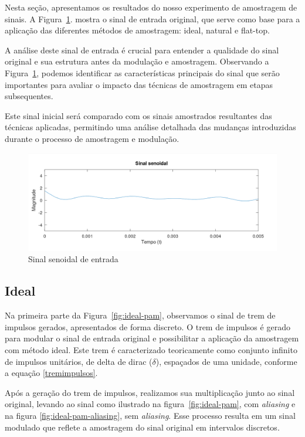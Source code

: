 Nesta seção, apresentamos os resultados do nosso experimento de amostragem de sinais. A Figura~\ref{fig:input-signal}. mostra o sinal de entrada original, que serve como base para a aplicação das diferentes métodos de amostragem: ideal, natural e flat-top.

A análise deste sinal de entrada é crucial para entender a qualidade do sinal original e sua estrutura antes da modulação e amostragem. Observando a Figura~\ref{fig:input-signal}, podemos identificar as características principais do sinal que serão importantes para avaliar o impacto das técnicas de amostragem em etapas subsequentes.

Este sinal inicial será comparado com os sinais amostrados resultantes das técnicas aplicadas, permitindo uma análise detalhada das mudanças introduzidas durante o processo de amostragem e modulação.

\begin{figure}[H]
    \centering
    \includegraphics[width=1\linewidth]{03_results/octave_results/sinal_senoidal.png}
    \caption{Sinal senoidal de entrada}
    \label{fig:input-signal}
\end{figure}

\subsection{Ideal}

Na primeira parte da Figura~\ref{fig:ideal-pam}, observamos o sinal de trem de impulsos gerados, apresentados de forma discreto. O trem de impulsos é gerado para modular o sinal de entrada original e possibilitar a aplicação da amostragem com método ideal. Este trem é caracterizado teoricamente como conjunto infinito de impulsos unitários, de delta de dirac ($\delta$), espaçados de uma unidade, conforme a equação  \ref{tremimpulsos}. 

Após a geração do trem de impulsos, realizamos sua multiplicação junto ao sinal original, levando ao sinal como ilustrado na figura~\ref{fig:ideal-pam}, com \textit{aliasing} e na figura \ref{fig:ideal-pam-aliasing}, sem \textit{aliasing}. Esse processo resulta em um sinal modulado que reflete a amostragem do sinal original em intervalos discretos. 

